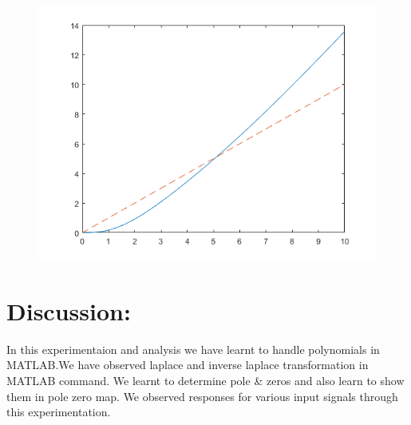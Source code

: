 \documentclass[conference]{IEEEtran}
\begin{document}
\begin{figure}[!h]
    \centering
    \includegraphics[width=\linewidth]{plot1.png}
    \label{fig:my_label}
\end{figure}


\section{Discussion:}
In this experimentaion and analysis we have 
learnt to handle polynomials in MATLAB.We 
have observed laplace and inverse 
laplace transformation in MATLAB 
command. We learnt to determine pole 
\& zeros and also learn to show them in pole zero 
map. We observed responses 
for various input signals through this experimentation.
\end{document}
